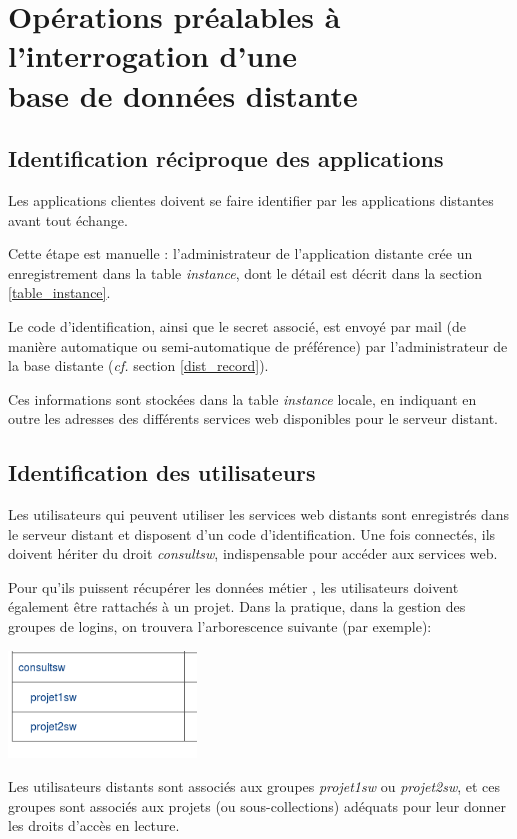\section{Opérations préalables à l'interrogation d'une \\base de données distante}
\subsection{Identification réciproque des applications}

Les applications clientes doivent se faire identifier par les applications distantes avant tout échange.

Cette étape est manuelle : l'administrateur de l'application distante crée un enregistrement dans la table \textit{instance}, dont le détail est décrit dans la section \ref{table_instance}.

Le code d'identification, ainsi que le secret associé, est envoyé par mail (de manière automatique ou semi-automatique de préférence) par l'administrateur de la base distante (\textit{cf.} section \ref{dist_record}).

Ces informations sont stockées dans la table \textit{instance} locale, en indiquant en outre les adresses des différents services web disponibles pour le serveur distant.

\subsection{Identification des utilisateurs}
Les utilisateurs qui peuvent utiliser les services web distants sont enregistrés dans le serveur distant et disposent d'un code d'identification. Une fois connectés, ils doivent hériter du droit \textit{consultsw}, indispensable pour accéder aux services web.

Pour qu'ils puissent récupérer les données \og métier \fg{}, les utilisateurs doivent également être rattachés à un projet. Dans la pratique, dans la gestion des groupes de logins, on trouvera l'arborescence suivante (par exemple):
\begin{center}

\includegraphics[width=5cm]{images/arborescence_groupes_sw}

\end{center}

Les utilisateurs distants sont associés aux groupes \textit{projet1sw} ou \textit{projet2sw}, et ces groupes sont associés aux projets (ou sous-collections) adéquats pour leur donner les droits d'accès en lecture.